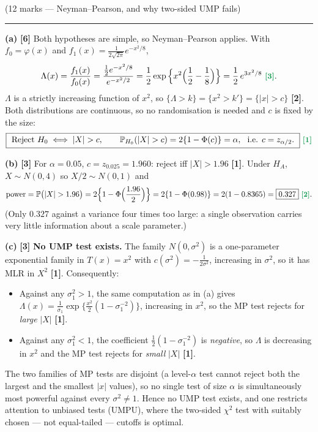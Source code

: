 \documentclass[11pt]{article}
\newcommand{\Prob}{\mathbb{P}}
\newcommand{\mk}[1]{{\small\color{ForestGreen}\textbf{[#1]}}}
\newcommand{\qhead}[2]{\bigskip\noindent{\large\bfseries Question #1}\quad\textnormal{\small(#2)}\par
  \vspace{2pt}\hrule\vspace{6pt}}
\begin{document}
\qhead{7}{12 marks --- Neyman--Pearson, and why two-sided UMP fails}

\noindent\textbf{(a)} \mk{6}
Both hypotheses are simple, so Neyman--Pearson applies. With
$f_0=\varphi(x)$ and $f_1(x)=\frac{1}{2\sqrt{2\pi}}e^{-x^{2}/8}$,
\[
\Lambda(x)=\frac{f_1(x)}{f_0(x)}
=\frac{\tfrac12 e^{-x^{2}/8}}{e^{-x^{2}/2}}
=\frac12\exp\Big\{x^{2}\Big(\frac12-\frac18\Big)\Big\}
=\frac12\,e^{3x^{2}/8}\ \mk{3}.
\]
$\Lambda$ is a strictly increasing function of $x^{2}$, so $\{\Lambda>k\}=\{x^{2}>k'\}=\{|x|>c\}$
\mk{2}. Both distributions are continuous, so no randomisation is needed and $c$ is fixed by
the size:
\[
\boxed{\ \text{Reject }H_0\iff |X|>c,\qquad \Prob_{H_0}(|X|>c)=2\{1-\Phi(c)\}=\alpha,
\ \text{ i.e. } c=z_{\alpha/2}.\ }\ \mk{1}
\]

\smallskip\noindent\textbf{(b)} \mk{3}
For $\alpha=0.05$, $c=z_{0.025}=1.960$: reject iff $|X|>1.96$ \mk{1}. Under $H_A$,
$X\sim N(0,4)$ so $X/2\sim N(0,1)$ and
\[
\text{power}=\Prob\big(|X|>1.96\big)=2\Big\{1-\Phi\Big(\frac{1.96}{2}\Big)\Big\}
=2\{1-\Phi(0.98)\}=2(1-0.8365)=\boxed{0.327}\ \mk{2}.
\]
(Only $0.327$ against a variance four times too large: a single observation carries very little
information about a scale parameter.)

\smallskip\noindent\textbf{(c)} \mk{3}
\textbf{No UMP test exists.} The family $N(0,\sigma^{2})$ is a one-parameter exponential
family in $T(x)=x^{2}$ with $c(\sigma^{2})=-\frac{1}{2\sigma^{2}}$, increasing in $\sigma^{2}$,
so it has MLR in $X^{2}$ \mk{1}. Consequently:
\begin{itemize}
\item Against any $\sigma_1^{2}>1$, the same computation as in (a) gives
$\Lambda(x)=\frac{1}{\sigma_1}\exp\{\frac{x^2}{2}(1-\sigma_1^{-2})\}$, increasing in $x^{2}$,
so the MP test rejects for \emph{large} $|X|$ \mk{1}.
\item Against any $\sigma_1^{2}<1$, the coefficient $\frac12(1-\sigma_1^{-2})$ is
\emph{negative}, so $\Lambda$ is decreasing in $x^{2}$ and the MP test rejects for
\emph{small} $|X|$ \mk{1}.
\end{itemize}
The two families of MP tests are disjoint (a level-$\alpha$ test cannot reject both the largest
and the smallest $|x|$ values), so no single test of size $\alpha$ is simultaneously most
powerful against every $\sigma^{2}\ne1$. Hence no UMP test exists, and one restricts attention
to unbiased tests (UMPU), where the two-sided $\chi^2$ test with suitably chosen --- not
equal-tailed --- cutoffs is optimal.
\end{document}
